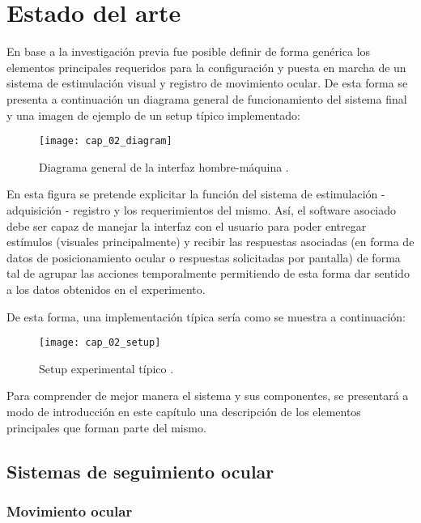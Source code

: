 \documentclass[../main.tex]{subfiles}
\begin{document}
		
\chapter{Estado del arte}
\label{cha:02_estado_del_arte}

	En base a la investigación previa fue posible definir de forma genérica los elementos principales requeridos para la configuración y puesta en marcha de un sistema de estimulación visual y registro de movimiento ocular. De esta forma se presenta a continuación un diagrama general de funcionamiento del sistema final y una imagen de ejemplo de un \gls{setup} típico implementado:   

	\begin{figure}[H]
		\centering
		\texttt{[image: cap\_02\_diagram]}
		\caption{Diagrama general de la interfaz hombre-máquina \cite{website:baseInfo}.}
		\label{fig:02_diagrama_interfaz}
	\end{figure}

	En esta figura se pretende explicitar la función del sistema de estimulación - adquisición - registro y los requerimientos del mismo. Así, el software asociado debe ser capaz de manejar la interfaz con el usuario para poder entregar estímulos (visuales principalmente) y recibir las respuestas asociadas (en forma de datos de posicionamiento ocular o respuestas solicitadas por pantalla) de forma tal de agrupar las acciones temporalmente permitiendo de esta forma dar sentido a los datos obtenidos en el experimento. 

	\newpage
	De esta forma, una implementación típica sería como se muestra a continuación:  

	\begin{figure}[H]
		\centering
		\texttt{[image: cap\_02\_setup]}
		\caption{Setup experimental típico \cite{website:baseInfo}.}
		\label{fig:02_ejemplo_setup}
	\end{figure}

	Para comprender de mejor manera el sistema y sus componentes, se presentará a modo de introducción en este capítulo una descripción de los elementos principales que forman parte del mismo. 

	\section{Sistemas de seguimiento ocular}
	\label{sec:02_sistemas_de_seguimiento_ocular}
		\subsection{Movimiento ocular}
		\label{sub:02_movimiento_ocular}
\end{document}
